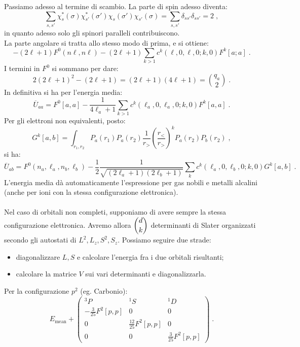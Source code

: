 \documentclass[10pt,a4paper]{report}
\theoremstyle{definition}
\numberwithin{equation}{section}
\begin{document}
Passiamo adesso al termine di scambio. La parte di spin adesso diventa:
\begin{equation}
\sum_{s,s'}\chi^*_s(\sigma)\chi^*_{s'}(\sigma')\chi_s(\sigma')\chi_{s'}(\sigma)=\sum_{s,s'}\delta_{ss'}\delta_{ss'}=2\;,
\end{equation}
in quanto adesso solo gli spinori paralleli contribuiscono. \\
La parte angolare si tratta allo stesso modo di prima, e si ottiene:
\begin{equation}
-(2\ell+1)F^0(n\ell,n\ell)-(2\ell+1)\sum_{k>1}c^k(\ell,0,\ell,0;k,0)F^k[a;a]\;.
\end{equation}
I termini in $F^0$ si sommano per dare:
\begin{equation}
2(2\ell+1)^2-(2\ell+1)=(2\ell+1)(4\ell+1)=\binom{q_a}{2}\;.
\end{equation}
In definitiva si ha per l'energia media:
\begin{equation}
\overline{U}_{aa}=F^0[a,a]-\frac{1}{4\ell_a+1}\sum_{k>1}c^k(\ell_a,0,\ell_a,0;k,0)F^k[a,a]\;.
\end{equation}
Per gli elettroni non equivalenti, posto:
\begin{equation}
G^k[a,b]=\int_{r_1,r_2}P_a(r_1)P_a(r_2)\frac{1}{r_>}\left(\frac{r_<}{r_>}\right)^kP_a(r_2)P_b(r_2)\;,
\end{equation}
si ha:
\begin{equation}
\overline{U}_{ab}=F^0(n_a,\ell_a,n_b,\ell_b)-\frac{1}{2}\frac{1}{\sqrt{(2\ell_a+1)(2\ell_b+1)}}\sum_k c^k(\ell_a,0,\ell_b,0;k,0)G^k[a,b]\;.
\end{equation}
L'energia media dà automaticamente l'espressione per gas nobili e metalli alcalini (anche per ioni con la stessa configurazione elettronica). \\
\\
Nel caso di orbitali non completi, supponiamo di avere sempre la stessa configurazione elettronica. Avremo allora $\dbinom{d}{k}$ determinanti di Slater organizzati secondo gli autostati di $L^2,L_z,S^2,S_z$. Possiamo seguire due strade:
\begin{itemize}
\item diagonalizzare $L,S$ e calcolare l'energia fra i due orbitali risultanti;
\item calcolare la matrice $V$ sui vari determinanti e diagonalizzarla.
\end{itemize}
Per la configurazione $p^2$ (eg. Carbonio):
\begin{equation}
E_{\mathrm{mean}}+\left(\begin{matrix}
{}^3P & {}^1S & {}^1D \\
-\frac{3}{25}F^2[p,p] & 0 & 0 \\
0 & \frac{12}{25}F^2[p,p] & 0 \\
0 & 0 & \frac{3}{25}F^2[p,p]
\end{matrix}\right)\;.
\end{equation}
\end{document}
